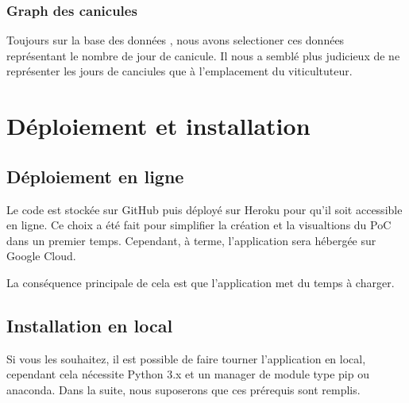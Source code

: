 \documentclass[letterpaper,10pt,french]{sphinxmanual}
\begin{document}
\subsubsection{Graph des canicules}
\label{\detokenize{indicateurs:graph-des-canicules}}
\sphinxAtStartPar
Toujours sur la base des données , nous avons selectioner ces données représentant le nombre de jour de canicule. Il nous a semblé plus judicieux de ne représenter les jours de canciules que à l’emplacement du viticultuteur.


\section{Déploiement et installation}
\label{\detokenize{use:deploiement-et-installation}}\label{\detokenize{use:instal}}\label{\detokenize{use::doc}}

\subsection{Déploiement en ligne}
\label{\detokenize{use:deploiement-en-ligne}}
\sphinxAtStartPar
Le code est stockée sur GitHub puis déployé sur Heroku pour qu’il soit accessible en ligne. Ce choix a été fait pour simplifier la création et la visualtions du PoC dans un premier temps. Cependant, à terme, l’application sera hébergée sur Google Cloud.

\sphinxAtStartPar
La conséquence principale de cela est que l’application met du temps à charger.


\subsection{Installation en local}
\label{\detokenize{use:installation-en-local}}
\sphinxAtStartPar
Si vous les souhaitez, il est possible de faire tourner l’application en local, cependant cela nécessite Python 3.x et un manager de module type pip ou anaconda.
Dans la suite, nous suposerons que ces pré\sphinxhyphen{}requis sont remplis.
\end{document}
